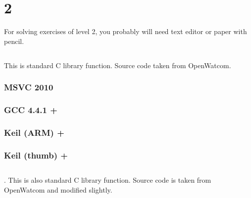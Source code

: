 \section{ 2}

{For solving exercises of level 2, you probably will need text editor or paper with pencil}.

\subsection{}

{This is standard C library function. Source code taken from OpenWatcom}.

\subsubsection{MSVC 2010}



\subsubsection{GCC 4.4.1 + \Othree}



\subsubsection{Keil (ARM) + \Othree}



\subsubsection{Keil (thumb) + \Othree}



\subsection{}

. 
{This is also standard C library function. Source code is taken from OpenWatcom and modified slightly}.

